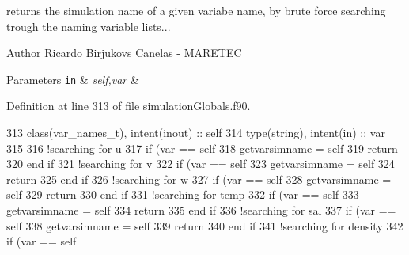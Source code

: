 returns the simulation name of a given variabe name, by brute force searching trough the naming variable lists... 

\begin{DoxyAuthor}{Author}
Ricardo Birjukovs Canelas -\/ M\+A\+R\+E\+T\+EC 
\end{DoxyAuthor}

\begin{DoxyParams}[1]{Parameters}
\mbox{\tt in}  & {\em self,var} & \\
\hline
\end{DoxyParams}


Definition at line 313 of file simulation\+Globals.\+f90.


\begin{DoxyCode}
313     \textcolor{keywordtype}{class}(var\_names\_t), \textcolor{keywordtype}{intent(inout)} :: self
314     \textcolor{keywordtype}{type}(string), \textcolor{keywordtype}{intent(in)} :: var
315 
316     \textcolor{comment}{!searching for u}
317     \textcolor{keywordflow}{if} (var == self%
318         getvarsimname = self%
319         \textcolor{keywordflow}{return}
320 \textcolor{keywordflow}{    end if}
321     \textcolor{comment}{!searching for v}
322     \textcolor{keywordflow}{if} (var == self%
323         getvarsimname = self%
324         \textcolor{keywordflow}{return}
325 \textcolor{keywordflow}{    end if}
326     \textcolor{comment}{!searching for w}
327     \textcolor{keywordflow}{if} (var == self%
328         getvarsimname = self%
329         \textcolor{keywordflow}{return}
330 \textcolor{keywordflow}{    end if}
331     \textcolor{comment}{!searching for temp}
332     \textcolor{keywordflow}{if} (var == self%
333         getvarsimname = self%
334         \textcolor{keywordflow}{return}
335 \textcolor{keywordflow}{    end if}
336     \textcolor{comment}{!searching for sal}
337     \textcolor{keywordflow}{if} (var == self%
338         getvarsimname = self%
339         \textcolor{keywordflow}{return}
340 \textcolor{keywordflow}{    end if}
341     \textcolor{comment}{!searching for density}
342     \textcolor{keywordflow}{if} (var == self%

\end{DoxyCode}
